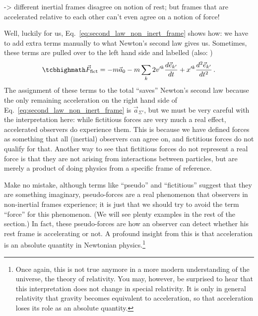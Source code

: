 \documentclass[../class_mech_main.tex]{subfiles}
\begin{document}
-> different inertial frames disagree on notion of rest; but frames that are accelerated relative to each other can't even agree on a notion of force!



Well, luckily for us, Eq.~\eqref{eq:second_law_non_inert_frame} shows how: we have to add extra terms manually to what Newton's second law gives us. Sometimes, these terms are pulled over to the left hand side and labelled  (also: )
\begin{equation}\label{eq:pseudo_force_general}
	\eqbox{
		\vec{F}_\mathrm{fict}
		= - m \vec{a}_0 - m \sum_k 2 v'^k \dv{\unitvec{k'}}{t} + x'^k \dv[2]{\unitvec{k'}}{t}
	}	\, .
\end{equation}
The assignment of these terms to the total \enquote{saves} Newton's second law because the only remaining acceleration on the right hand side of Eq.~\eqref{eq:second_law_non_inert_frame} is $\vec{a}_{\Sigma'}$, but we must be very careful with the interpretation here: while fictitious forces are very much a real effect, accelerated observers do experience them. This is because we have defined forces as something that all (inertial) observers can agree on, and fictitious forces do not qualify for that. Another way to see that fictitious forces do not represent a real force is that they are not arising from interactions between particles, but are merely a product of doing physics from a specific frame of reference.




Make no mistake, although terms like \enquote{pseudo} and \enquote{fictitious} suggest that they are something imaginary, pseudo-forces are a real phenomenon that observers in non-inertial frames experience; it is just that we should try to avoid the term \enquote{force} for this phenomenon. (We will see plenty examples in the rest of the section.) In fact, these pseudo-forces are how an observer can detect whether his rest frame is accelerating or not. A profound insight from this is that acceleration is an absolute quantity in Newtonian physics.\footnote{Once again, this is not true anymore in a more modern understanding of the universe, the theory of relativity. You may, however, be surprised to hear that this interpretation does not change in special relativity. It is only in general relativity that gravity becomes equivalent to acceleration, so that acceleration loses its role as an absolute quantity.}
\end{document}
